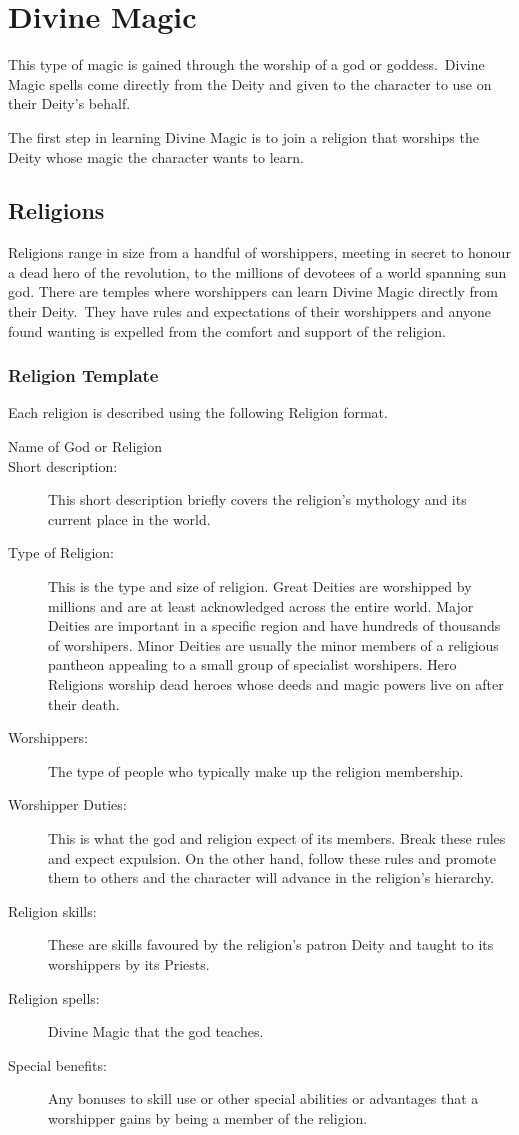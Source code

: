 \chapter{Divine Magic}
\label{ch:divine}

This type of magic is gained through the worship of a god or goddess. Divine Magic spells come directly from the Deity and given to the character to use on their Deity’s behalf. 

The first step in learning Divine Magic is to join a religion that worships the Deity whose magic the character wants to learn.

\section{Religions}
Religions range in size from a handful of worshippers, meeting in secret to honour a dead hero of the revolution, to the millions of devotees of a world spanning sun god. There are temples where worshippers can learn Divine Magic directly from their Deity. They have rules and expectations of their worshippers and anyone found wanting is expelled from the comfort and support of the religion. 

\subsection{Religion Template}
Each religion is described using the following Religion format.
\begin{description}
\item[Name of God or Religion]
\item[Short description:] This short description briefly covers the religion’s mythology and its current place in the world.
\item[Type of Religion:] This is the type and size of religion. Great Deities are worshipped by millions and are at least acknowledged across the entire world. Major Deities are important in a specific region and have hundreds of thousands of worshipers. Minor Deities are usually the minor members of a religious pantheon appealing to a small group of specialist worshipers. Hero Religions worship dead heroes whose deeds and magic powers live on after their death.
\item[Worshippers:] The type of people who typically make up the religion membership.
\item[Worshipper Duties:] This is what the god and religion expect of its members. Break these rules and expect expulsion. On the other hand, follow these rules and promote them to others and the character will advance in the religion’s hierarchy.
\item[Religion skills:] These are skills favoured by the religion’s patron Deity and taught to its worshippers by its Priests.
\item[Religion spells:] Divine Magic that the god teaches.
\item[Special benefits:] Any bonuses to skill use or other special abilities or advantages that a worshipper gains by being a member of the religion.
\end{description}

